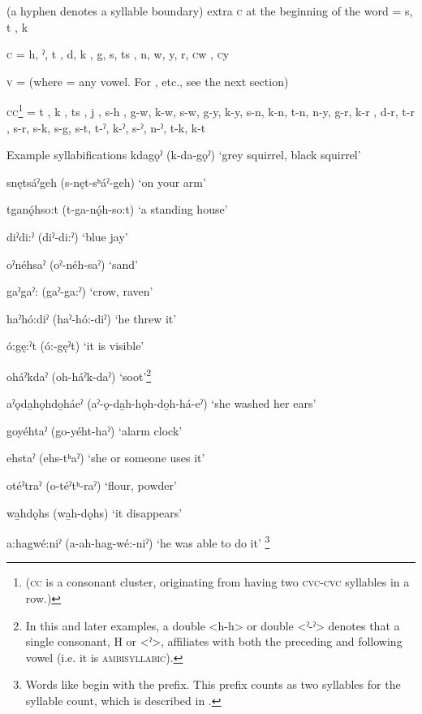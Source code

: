 \ea\label{ex:pos} (a hyphen denotes a syllable boundary)
\ea extra \textsc{c} at the beginning of the word = s, t , k \label{ex:posa}

\ex \textsc{c} = h, ˀ, t , d, k , g, s, ts , n, w, y, r, \textsc{c}w , \textsc{c}y \label{ex:posb}

\ex \textsc{v} =  (where  = any vowel. For , etc., see the next section)\label{ex:posc}

\ex \textsc{cc}\footnote{(\textsc{cc} is a consonant cluster, originating from having two \textsc{cvc-cvc} syllables in a row.)} = t , k , ts , j , s-h , g-w, k-w, s-w, g-y, k-y, s-n, k-n, t-n, n-y, g-r, k-r , d-r, t-r , s-r, s-k, s-g, s-t, t-ˀ, k-ˀ, s-ˀ, n-ˀ, t-k, k-t\label{ex:posd}
\z
\z

\largerpage
\ea\label{ex:sylex} Example syllabifications
\ea kdagǫˀ (k-da-gǫˀ) ‘grey squirrel, black squirrel’

\ex snętsáˀgeh (s-nęt-sʰáˀ-geh) ‘on your arm’

\ex tganǫ́hso:t (t-ga-nǫ́h-so:t) ‘a standing house’

\ex diˀdi:ˀ (diˀ-di:ˀ) ‘blue jay’

\ex oˀnéhsaˀ (oˀ-néh-saˀ) ‘sand’

\ex gaˀgaˀ: (gaˀ-ga:ˀ) ‘crow, raven’

\ex haˀhó:diˀ (haˀ-hó:-diˀ) ‘he threw it’

\ex ó:gę:ˀt (ó:-gęˀt) ‘it is visible’

\ex oháˀkdaˀ (oh-háˀk-daˀ) ‘soot’\footnote{In this and later examples, a double <h-h> or double <ˀ-ˀ> denotes that a single consonant, H or <ˀ>, affiliates with both the preceding and following vowel (i.e. it is \textsc{ambisyllabic}).}

\ex aˀǫda̱hǫhdo̱háeˀ (aˀ-ǫ-da̱h-hǫh-do̱h-há-eˀ) ‘she washed her ears’

\ex goyéhtaˀ (go-yéht-haˀ) ‘alarm clock’

\ex ehstaˀ (ehs-tʰaˀ) ‘she or someone uses it’

\ex otéˀtraˀ  (o-téˀtʰ-raˀ) ‘flour, powder’

\ex wa̱hdǫhs (wa̱h-dǫhs) ‘it disappears’

\ex a:hagwé:niˀ (a-ah-hag-wé:-niˀ) ‘he was able to do it’ \footnote{Words like  begin with the  {\indefinite} prefix. This prefix counts as two syllables for the syllable count, which is described in .}


